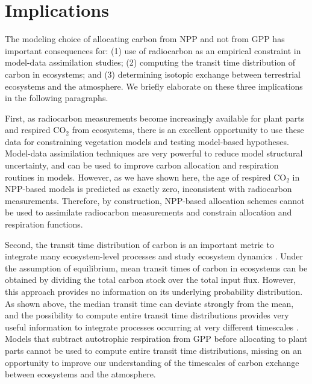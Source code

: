 \documentclass[bg, manuscript]{copernicus}
\begin{document}
\section{Implications}
The modeling choice of allocating carbon from NPP and not from GPP has important consequences for: (1) use of radiocarbon as an empirical constraint in model-data assimilation studies; (2) computing the transit time distribution of carbon in ecosystems; and (3) determining isotopic exchange between terrestrial ecosystems and the atmosphere. We briefly elaborate on these three implications in the following paragraphs. 

First, as radiocarbon measurements become increasingly available for plant parts and respired CO$_2$ from ecosystems, there is an excellent opportunity to use these data for constraining vegetation models and testing model-based hypotheses. Model-data assimilation techniques are very powerful to reduce model structural uncertainty, and can be used to improve carbon allocation and respiration routines in models.  However, as we have shown here, the age of respired CO$_2$ in NPP-based models is predicted as exactly zero, inconsistent with radiocarbon measurements. Therefore, by construction, NPP-based allocation schemes cannot be used to assimilate radiocarbon measurements and constrain allocation and respiration functions. 

Second, the transit time distribution of carbon is an important metric to integrate many ecosystem-level processes and study ecosystem dynamics \citep{Bolin1973, Thompson1999, Sierra2017GCB}. Under the assumption of equilibrium, mean transit times of carbon in ecosystems can be obtained by dividing the total carbon stock over the total input flux. However, this approach provides no information on its underlying probability distribution. As shown above, the median transit time can deviate strongly from the mean, and the possibility to compute entire transit time distributions provides very useful information to integrate processes occurring at very different timescales \citep{Sierra2021JE}. Models that subtract autotrophic respiration from GPP before allocating to plant parts cannot be used to compute entire transit time distributions, missing on an opportunity to improve our understanding of the timescales of carbon exchange between ecosystems and the atmosphere. 
\end{document}
